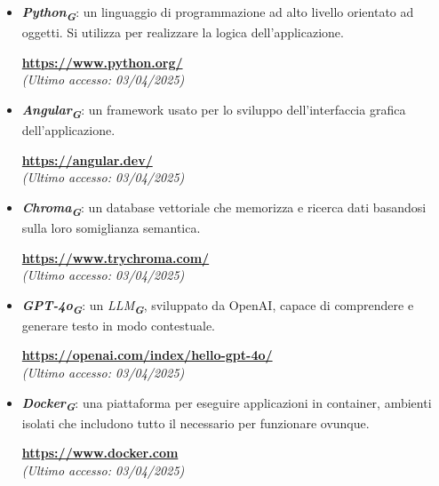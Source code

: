 \label{sec:tecnologie_utilizzate}

\begin{itemize}
    \item \textbf{\emph{Python}\textsubscript{\textit{\textbf{G}}}}: un linguaggio di programmazione ad alto livello orientato ad oggetti. Si
    utilizza per realizzare la logica dell’applicazione.
    \begin{center}
        \textbf{\url{https://www.python.org/}} \\
        \emph{(Ultimo accesso: 03/04/2025)}
    \end{center}

    \item \textbf{\emph{Angular}\textsubscript{\textit{\textbf{G}}}}: un framework usato per lo sviluppo dell’interfaccia grafica dell’applicazione.
    \begin{center}
        \textbf{\url{https://angular.dev/}} \\
        \emph{(Ultimo accesso: 03/04/2025)}
    \end{center}
    
    \item \textbf{\emph{Chroma}\textsubscript{\textit{\textbf{G}}}}: un database vettoriale che memorizza e ricerca dati basandosi sulla loro somiglianza semantica.
    \begin{center}
        \textbf{\url{https://www.trychroma.com/}} \\
        \emph{(Ultimo accesso: 03/04/2025)}
    \end{center}

    \item \textbf{\emph{GPT-4o}\textsubscript{\textit{\textbf{G}}}}: un \emph{LLM}\textsubscript{\textit{\textbf{G}}}, sviluppato da OpenAI, capace di comprendere e generare testo in modo contestuale.
    \begin{center}
        \textbf{\url{https://openai.com/index/hello-gpt-4o/}} \\
        \emph{(Ultimo accesso: 03/04/2025)}
    \end{center}

    \item \textbf{\emph{Docker}\textsubscript{\textit{\textbf{G}}}}: una piattaforma per eseguire applicazioni in container, ambienti isolati che includono tutto il necessario per funzionare ovunque.
    \begin{center}
        \textbf{\url{https://www.docker.com}} \\
        \emph{(Ultimo accesso: 03/04/2025)}
    \end{center}
    

\end{itemize}
